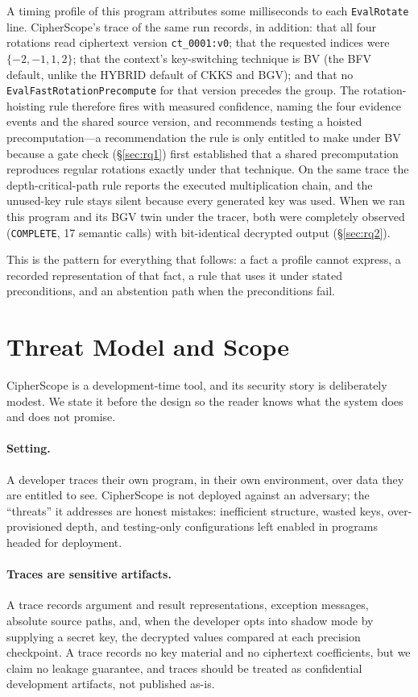 \documentclass[sigconf,nonacm]{acmart}
\begin{document}
A timing profile of this program attributes some milliseconds to each
\texttt{EvalRotate} line. CipherScope's trace of the same run records, in
addition: that all four rotations read ciphertext version
\texttt{ct\_0001:v0}; that the requested indices were $\{-2,-1,1,2\}$; that
the context's key-switching technique is BV (the BFV default, unlike the
HYBRID default of CKKS and BGV); and that no
\texttt{EvalFastRotationPrecompute} for that version precedes the group. The
rotation-hoisting rule therefore fires with measured confidence, naming the
four evidence events and the shared source version, and recommends testing a
hoisted precomputation---a recommendation the rule is only entitled to make
under BV because a gate check (\S\ref{sec:rq1}) first established that a
shared precomputation reproduces regular rotations exactly under that
technique. On the same trace the depth-critical-path rule reports the
executed multiplication chain, and the unused-key rule stays silent because
every generated key was used. When we ran this program and its BGV twin
under the tracer, both were completely observed (\texttt{COMPLETE}, 17
semantic calls) with bit-identical decrypted output (\S\ref{sec:rq2}).

This is the pattern for everything that follows: a fact a profile cannot
express, a recorded representation of that fact, a rule that uses it under
stated preconditions, and an abstention path when the preconditions fail.

\section{Threat Model and Scope}
\label{sec:threat}

CipherScope is a development-time tool, and its security story is
deliberately modest. We state it before the design so the reader knows what
the system does and does not promise.

\paragraph{Setting.} A developer traces their own program, in their own
environment, over data they are entitled to see. CipherScope is not deployed
against an adversary; the ``threats'' it addresses are honest mistakes:
inefficient structure, wasted keys, over-provisioned depth, and testing-only
configurations left enabled in programs headed for deployment.

\paragraph{Traces are sensitive artifacts.} A trace records argument and
result representations, exception messages, absolute source paths, and, when
the developer opts into shadow mode by supplying a secret key, the decrypted
values compared at each precision checkpoint. A trace records no key material
and no ciphertext coefficients, but we claim no leakage guarantee, and traces
should be treated as confidential development artifacts, not published
as-is.
\end{document}
